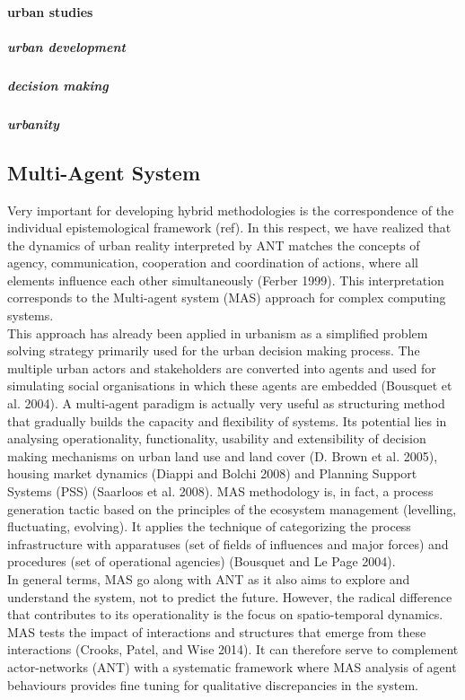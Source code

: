 \documentclass[11pt]{report}
\begin{document}
\paragraph{urban studies}

\subparagraph{urban development}

\subparagraph{decision making}

\subparagraph{urbanity}


\subsection{Multi-Agent System}

Very important for developing hybrid methodologies is the correspondence of the individual epistemological framework (ref). In this respect, we have realized that the dynamics of urban reality interpreted by ANT matches the concepts of agency, communication, cooperation and coordination of actions, where all elements influence each other simultaneously (Ferber 1999). This interpretation corresponds to the Multi-agent system (MAS) approach for complex computing systems.
\\
This approach has already been applied in urbanism as a simplified problem solving strategy primarily used for the urban decision making process. The multiple urban actors and stakeholders are converted into agents and used for simulating social organisations in which these agents are embedded (Bousquet et al. 2004). A multi-agent paradigm is actually very useful as structuring method that gradually builds the capacity and flexibility of systems. Its potential lies in analysing  operationality, functionality, usability and extensibility of decision making mechanisms on urban land use and land cover (D. Brown et al. 2005), housing market dynamics (Diappi and Bolchi 2008) and Planning Support Systems (PSS) (Saarloos et al. 2008). MAS methodology is, in fact, a process generation tactic based on the principles of the ecosystem management (levelling, fluctuating, evolving). It applies the technique of categorizing the process infrastructure with apparatuses (set of fields of influences and major forces) and procedures (set of operational agencies) (Bousquet and Le Page 2004).
\\
In general terms, MAS go along with ANT as it also aims to explore and understand the system, not to predict the future. However, the radical difference that contributes to its operationality is the focus on spatio-temporal dynamics. MAS tests the impact of interactions and structures that emerge from these interactions (Crooks, Patel, and Wise 2014). It can therefore serve to complement actor-networks (ANT) with a systematic framework where MAS analysis of agent behaviours provides fine tuning for qualitative discrepancies in the system. 
\end{document}
